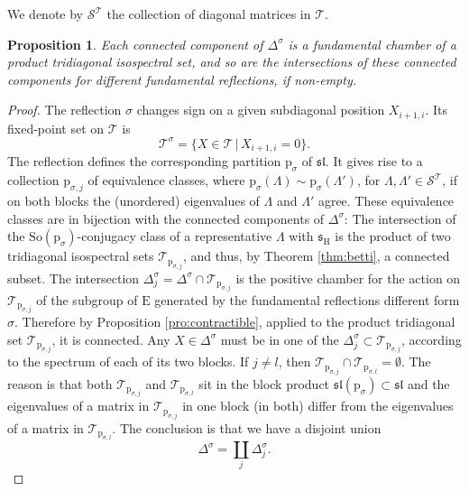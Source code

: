 \documentclass[reqno]{amsart}
\newcommand{\p}{\mathrm{p}}
\renewcommand{\ss}{\mathfrak{s}}
\renewcommand{\sl}{\mathfrak{sl}}
\newcommand{\cS}{\mathcal{S}}
\newcommand{\cT}{\mathcal{T}}
\newcommand{\E}{\mathrm{E}}
\newcommand{\So}{\mathrm{So}}
\renewcommand{\H}{\mathrm{H}}
\newtheorem{proposition}[theorem]{Proposition}
\begin{document}
We  denote by $\cS^\cT$ the collection of diagonal matrices in $\cT$.
\begin{proposition}\label{pro:mirror}  Each connected component of $\Delta^\sigma$ is a fundamental chamber of a product  tridiagonal isospectral set, and so are the intersections of these connected components for different fundamental reflections, if non-empty.
 \end{proposition}
\begin{proof}
The reflection $\sigma$ changes sign on a given subdiagonal position $X_{i+1,i}$. Its fixed-point set on $\cT$ is
\[\cT^\sigma=\{X\in \cT\,|\, X_{i+1,i}=0\}.\]
The reflection defines the corresponding partition $\p_\sigma$ of $\sl$. It gives rise to a collection $\p_{\sigma,j}$ of equivalence classes, where $\p_\sigma(\Lambda)\sim \p_\sigma(\Lambda')$, for $\Lambda,\Lambda'\in\cS^\cT$,  if on both blocks the (unordered) eigenvalues of $\Lambda$ and $\Lambda'$ agree.
These equivalence classes  are in bijection with the connected components of $\Delta^\sigma$: The intersection of the  $\So(\p_\sigma)$-conjugacy class of a representative $\Lambda$ with $\ss_\H$ is the product of two tridiagonal isospectral sets $\cT_{\p_{\sigma,j}}$, and thus, by Theorem \ref{thm:betti},  a connected subset. The intersection $\Delta^\sigma_j=\Delta^\sigma\cap \cT_{\p_{\sigma,j}}$ is the positive chamber for the action on $\cT_{\p_{\sigma,j}}$ of the subgroup of $\E$ generated by the fundamental reflections different form $\sigma$. Therefore
by Proposition \ref{pro:contractible}, applied to the product tridiagonal set $\cT_{\p_{\sigma,j}}$,
it is connected.
Any $X\in \Delta^\sigma$ must be in one of the $\Delta^\sigma_j\subset \cT_{\p_{\sigma,j}}$, according to the spectrum of each of its two blocks.
If $j\neq l$, then $\cT_{\p_{\sigma,j}}\cap \cT_{\p_{\sigma,l}}=\emptyset$. The reason is that
both $\cT_{\p_{\sigma,j}}$ and  $\cT_{\p_{\sigma,l}}$ sit in the block product $\sl(\p_\sigma)\subset \sl$ and the eigenvalues of a matrix in $\cT_{\p_{\sigma,j}}$ in one block (in both) differ from the eigenvalues of a matrix in $\cT_{\p_{\sigma,l}}$. The conclusion is that we have a disjoint union
\[\Delta^\sigma=\coprod_j \Delta^\sigma_j.\]



\end{proof}
\end{document}
